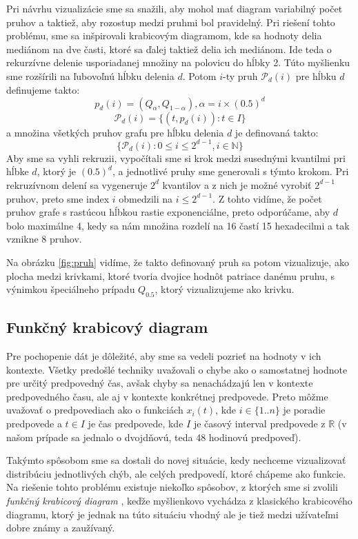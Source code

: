 Pri návrhu vizualizácie sme sa snažili, aby mohol mať diagram variabilný počet pruhov a taktiež, aby rozostup medzi pruhmi bol pravidelný. Pri riešení tohto problému, sme sa inšpirovali krabicovým diagramom, kde sa hodnoty delia mediánom na dve časti, ktoré sa ďalej taktiež delia ich mediánom. Ide teda o rekurzívne delenie usporiadanej množiny na polovicu do hĺbky 2. Túto myšlienku sme rozšírili na ľubovoľnú hĺbku delenia $ d $. Potom $ i $-ty pruh $ \mathcal{P}_{d}(i) $ pre hĺbku $ d $ definujeme takto:
\[
	p_{d}(i) = (Q_{\alpha},Q_{1 - \alpha}) , \alpha = i \times (0.5)^d 	
\]
\[
	\mathcal{P}_{d}(i) = \{ (t,p_{d}(i)) : t \in I \}
\]
a množina všetkých pruhov grafu pre hĺbku delenia $ d $ je definovaná takto:
\[
	\{ \mathcal{P}_{d}(i) : 0 \leq i \leq 2^{d-1} , i \in \mathbb{N} \}
\]
Aby sme sa vyhli rekruzii, vypočítali sme si krok medzi susednými kvantilmi pri hĺbke $ d $, ktorý je $ (0.5)^d $, a jednotlivé pruhy sme generovali s týmto krokom. Pri rekruzívnom delení sa vygeneruje $ 2^d $ kvantilov a z nich je možné vyrobiť $ 2^{d - 1} $ pruhov, preto sme index $ i $ obmedzili na $ i \leq 2^{d-1} $. Z tohto vidíme, že počet pruhov grafe s rastúcou hĺbkou rastie exponenciálne, preto odporúčame, aby $ d $ bolo maximálne 4, kedy sa nám množina rozdelí na 16 častí 15 hexadecilmi a tak vznikne 8 pruhov.

Na obrázku \ref{fig:pruh} vidíme, že takto definovaný pruh sa potom vizualizuje, ako plocha medzi krivkami, ktoré tvoria dvojice hodnôt patriace danému pruhu, s výnimkou špeciálneho prípadu $ Q_{0.5} $, ktorý vizualizujeme ako krivku.





\subsection{Funkčný krabicový diagram}
Pre pochopenie dát je dôležité, aby sme sa vedeli pozrieť na hodnoty v ich kontexte. Všetky predošlé techniky uvažovali o chybe ako o samostatnej hodnote pre určitý predpovedný čas, avšak chyby sa nenachádzajú len v kontexte predpovedného času, ale aj v kontexte konkrétnej predpovede. Preto môžme uvažovať o predpovediach ako o funkciách $ x_{i}(t) $, kde $ i \in \{1..n\}$ je poradie predpovede a $ t \in I $ je čas predpovede, kde $ I $ je časový interval predpovede z $ \mathbb{R} $ (v našom prípade sa jednalo o dvojdňovú, teda 48 hodinovú predpoveď).

Takýmto spôsobom sme sa dostali do novej situácie, kedy nechceme vizualizovať distribúciu jednotlivých chýb, ale celých predpovedí, ktoré chápeme ako funkcie. Na riešenie tohto problému existuje niekoľko spôsobov, z ktorých sme si zvolili \textit{funkčný krabicový diagram} \cite{FunctionalBoxplot}, keďže myšlienkovo vychádza z klasického krabicového diagramu, ktorý je jednak na túto situáciu vhodný ale je tiež medzi užívateľmi dobre známy a zaužívaný.

